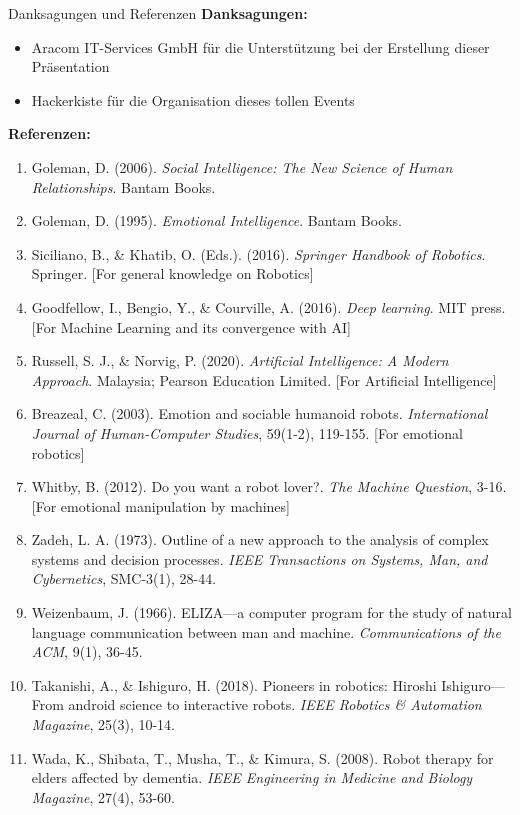 \documentclass[aspectratio=169]{beamer}
\begin{document}
\begin{frame}{Danksagungen und Referenzen}
  \textbf{Danksagungen:}
  \begin{itemize}
      \item Aracom IT-Services GmbH für die Unterstützung bei der Erstellung dieser Präsentation
      \item Hackerkiste für die Organisation dieses tollen Events
  \end{itemize}
  
  \textbf{Referenzen:}
  \begin{enumerate}
      \item Goleman, D. (2006). \textit{Social Intelligence: The New Science of Human Relationships}. Bantam Books.
      \item Goleman, D. (1995). \textit{Emotional Intelligence}. Bantam Books. 
      \item Siciliano, B., \& Khatib, O. (Eds.). (2016). \textit{Springer Handbook of Robotics}. Springer. [For general knowledge on Robotics]
      \item Goodfellow, I., Bengio, Y., \& Courville, A. (2016). \textit{Deep learning}. MIT press. [For Machine Learning and its convergence with AI]
      \item Russell, S. J., \& Norvig, P. (2020). \textit{Artificial Intelligence: A Modern Approach}. Malaysia; Pearson Education Limited. [For Artificial Intelligence]
      \item Breazeal, C. (2003). Emotion and sociable humanoid robots. \textit{International Journal of Human-Computer Studies}, 59(1-2), 119-155. [For emotional robotics]
      \item Whitby, B. (2012). Do you want a robot lover?. \textit{The Machine Question}, 3-16. [For emotional manipulation by machines]
      \item Zadeh, L. A. (1973). Outline of a new approach to the analysis of complex systems and decision processes. \textit{IEEE Transactions on Systems, Man, and Cybernetics}, SMC-3(1), 28-44.
      \item Weizenbaum, J. (1966). ELIZA—a computer program for the study of natural language communication between man and machine. \textit{Communications of the ACM}, 9(1), 36-45.
      \item Takanishi, A., \& Ishiguro, H. (2018). Pioneers in robotics: Hiroshi Ishiguro—From android science to interactive robots. \textit{IEEE Robotics \& Automation Magazine}, 25(3), 10-14.
      \item Wada, K., Shibata, T., Musha, T., \& Kimura, S. (2008). Robot therapy for elders affected by dementia. \textit{IEEE Engineering in Medicine and Biology Magazine}, 27(4), 53-60.

\end{enumerate}
\end{frame}
\end{document}
